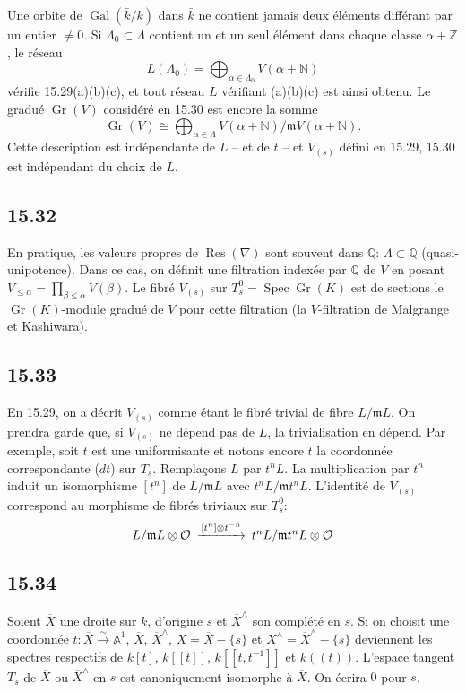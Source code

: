 \documentclass[12pt,a4paper]{article}
\theoremstyle{plain}
\theoremstyle{definition}
\theoremstyle{remark}
\DeclareMathOperator{\Spec}{Spec}
\DeclareMathOperator{\Gr}{Gr}
\DeclareMathOperator{\Res}{Res}
\DeclareMathOperator{\Gal}{Gal}
\newcommand{\cO}{\mathcal{O}}
\newcommand{\bZ}{\mathbb{Z}}
\newcommand{\bQ}{\mathbb{Q}}
\newcommand{\bA}{\mathbb{A}}
\newcommand{\bN}{\mathbb{N}}
\begin{document}
Une orbite de $\Gal(\bar{k}/k)$ dans $\bar{k}$ ne contient jamais deux éléments différant par un entier $\neq 0$. Si $\Lambda_0 \subset \Lambda$ contient un et un seul élément dans chaque classe $\alpha + \bZ$, le réseau
\[
L(\Lambda_0) = \bigoplus_{\alpha \in \Lambda_0} V(\alpha + \bN)
\]
vérifie 15.29(a)(b)(c), et tout réseau $L$ vérifiant (a)(b)(c) est ainsi obtenu. Le gradué $\Gr(V)$ considéré en 15.30 est encore la somme
\[
\Gr(V) \cong \bigoplus_{\alpha \in \Lambda} V(\alpha + \bN)/\mathfrak{m}V(\alpha + \bN).
\]
Cette description est indépendante de $L$ -- et de $t$ -- et $V_{(s)}$ défini en 15.29, 15.30 est indépendant du choix de $L$.

\subsection*{15.32}

En pratique, les valeurs propres de $\Res(\nabla)$ sont souvent dans $\bQ$: $\Lambda \subset \bQ$ (quasi-unipotence). Dans ce cas, on définit une filtration indexée par $\bQ$ de $V$ en posant $V_{\leqslant \alpha} = \prod_{\beta \leqslant \alpha} V(\beta)$. Le fibré $V_{(s)}$ sur $T_s^0 = \Spec \Gr(K)$ est de sections le $\Gr(K)$-module gradué de $V$ pour cette filtration (la $V$-filtration de Malgrange et Kashiwara).

\subsection*{15.33}

En 15.29, on a décrit $V_{(s)}$ comme étant le fibré trivial de fibre $L/\mathfrak{m}L$. On prendra garde que, si $V_{(s)}$ ne dépend pas de $L$, la trivialisation en dépend. Par exemple, soit $t$ est une uniformisante et notons encore $t$ la coordonnée correspondante ($dt$) sur $T_s$. Remplaçons $L$ par $t^n L$. La multiplication par $t^n$ induit un isomorphisme $[t^n]$ de $L/\mathfrak{m}L$ avec $t^n L/\mathfrak{m} t^n L$. L'identité de $V_{(s)}$ correspond au morphisme de fibrés triviaux sur $T_s^0$:
\[
\begin{CD}
L/\mathfrak{m}L \otimes \cO @>{[t^n] \otimes t^{-n}}>> t^n L/\mathfrak{m}t^n L \otimes \cO
\end{CD}
\]

\subsection*{15.34}

Soient $\overline{X}$ une droite sur $k$, d'origine $s$ et $\overline{X}^\wedge$ son complété en $s$. Si on choisit une coordonnée $t: \overline{X} \xrightarrow{\sim} \bA^1$, $\overline{X}$, $\overline{X}^\wedge$, $X = \overline{X} - \{s\}$ et $X^\wedge = \overline{X}^\wedge - \{s\}$ deviennent les spectres respectifs de $k[t]$, $k[[t]]$, $k[[t, t^{-1}]]$ et $k((t))$. L'espace tangent $T_s$ de $\overline{X}$ ou $\overline{X}^\wedge$ en $s$ est canoniquement isomorphe à $\overline{X}$. On écrira $0$ pour $s$.
\end{document}
